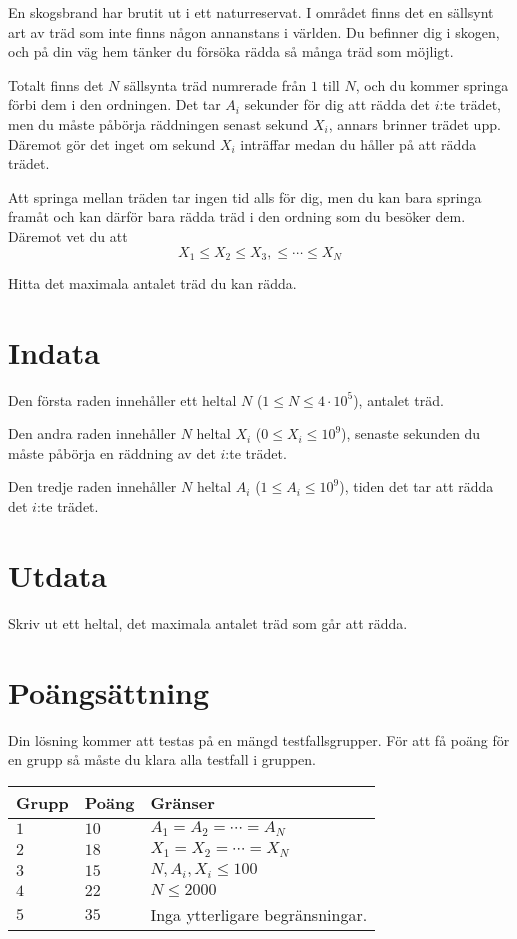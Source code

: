 
En skogsbrand har brutit ut i ett naturreservat. I området finns det en sällsynt art av träd
som inte finns någon annanstans i världen. Du befinner dig i skogen, och på din väg hem tänker du försöka rädda så många träd som möjligt.

Totalt finns det $N$ sällsynta träd numrerade från $1$ till $N$, och du kommer springa förbi dem i den ordningen. 
Det tar $A_i$ sekunder för dig att rädda det $i$:te trädet, men du måste påbörja räddningen
senast sekund $X_i$, annars brinner trädet upp. Däremot gör det inget om sekund $X_i$ inträffar medan
du håller på att rädda trädet.

Att springa mellan träden tar ingen tid alls för dig, men du kan bara springa framåt och kan därför
bara rädda träd i den ordning som du besöker dem. Däremot vet du att
$$X_1 \leq X_2 \leq X_3, \leq \cdots \leq X_N$$

Hitta det maximala antalet träd du kan rädda.

\section*{Indata}
Den första raden innehåller ett heltal $N$ ($1 \leq N \leq 4 \cdot 10^5$), antalet träd.

Den andra raden innehåller $N$ heltal $X_i$ ($0 \leq X_i \leq 10^9$), senaste sekunden du måste
påbörja en räddning av det $i$:te trädet.

Den tredje raden innehåller $N$ heltal $A_i$ ($1 \leq A_i \leq 10^9$), tiden det tar att rädda det 
$i$:te trädet.

\section*{Utdata}
Skriv ut ett heltal, det maximala antalet träd som går att rädda.

\section*{Poängsättning}
Din lösning kommer att testas på en mängd testfallsgrupper.
För att få poäng för en grupp så måste du klara alla testfall i gruppen.

\noindent
\begin{tabular}{| l | l | p{12cm} |}
  \hline
  \textbf{Grupp} & \textbf{Poäng} & \textbf{Gränser} \\ \hline
  $1$   & $10$       & $A_1 = A_2 = \cdots = A_N$\\ \hline
  $2$   & $18$       & $X_1 = X_2 = \cdots = X_N$  \\ \hline
  $3$   & $15$       & $N, A_i, X_i \leq 100$ \\ \hline
  $4$   & $22$       & $N \leq 2000$ \\ \hline
  $5$   & $35$       & Inga ytterligare begränsningar. \\ \hline
\end{tabular}
